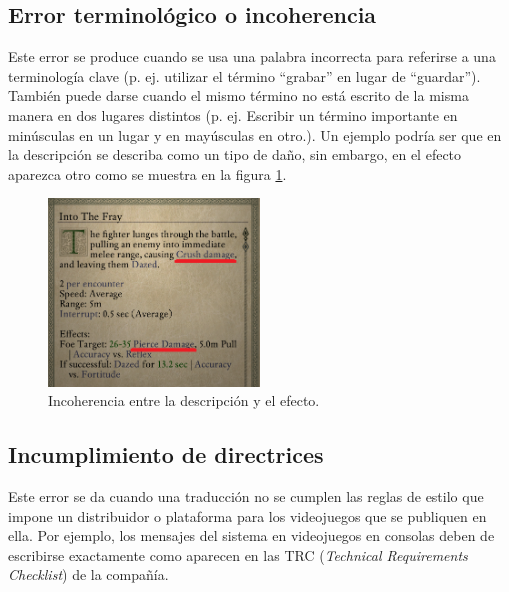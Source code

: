 \subsection{Error terminológico o incoherencia}\label{ErrorTermino}
Este error se produce cuando se usa una palabra incorrecta para referirse a una
terminología clave (p. ej. utilizar el término ``grabar'' en lugar de ``guardar''). También
puede darse cuando el mismo término no está escrito de la misma manera en dos
lugares distintos (p. ej. Escribir un término importante en minúsculas en un lugar
y en mayúsculas en otro.).
Un ejemplo podría ser que en la descripción se describa como un tipo de daño, sin embargo, en el efecto aparezca otro como se muestra en la figura \ref{fig:EIncoherencia}.
\begin{figure}[H]
	\centering
	\includegraphics[width = 0.5\textwidth]{Imagenes/Errores_Localizacion/E_Incoherencia.png}
	\caption{Incoherencia entre la descripción y el efecto.}
	\label{fig:EIncoherencia}
\end{figure}

\subsection{Incumplimiento de directrices}\label{ErrorDirectrices}
Este error se da cuando una traducción no se cumplen las reglas de estilo que
impone un distribuidor o plataforma para los videojuegos que se publiquen en ella.
Por ejemplo, los mensajes del sistema en videojuegos en consolas deben de escribirse
exactamente como aparecen en las TRC (\textit{Technical Requirements Checklist}) de la compañía.

